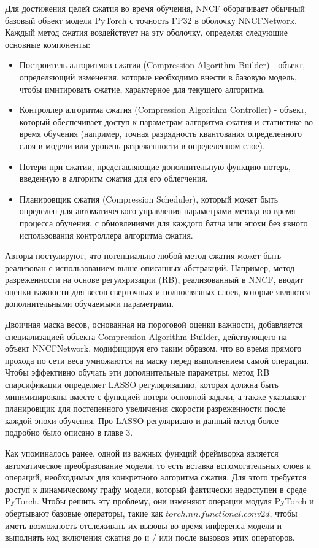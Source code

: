 \documentclass[oneside,final,12pt]{extreport}
\begin{document}
Для достижения целей сжатия во время обучения, NNCF оборачивает обычный базовый объект модели PyTorch с точность FP32 в оболочку NNCFNetwork. Каждый метод сжатия воздействует на эту оболочку, определяя следующие основные компоненты:
\begin{itemize}
    \item Построитель алгоритмов сжатия (Compression Algorithm Builder) - объект, определяющий изменения, которые необходимо внести в базовую модель, чтобы имитировать сжатие, характерное для текущего алгоритма.
    \item Контроллер алгоритма сжатия (Compression Algorithm Controller) - объект, который обеспечивает доступ к параметрам алгоритма сжатия и статистике во время обучения (например, точная разрядность квантования определенного слоя в модели или уровень разреженности в определенном слое).
    \item Потери при сжатии, представляющие дополнительную функцию потерь, введенную в алгоритм сжатия для его облегчения.
    \item Планировщик сжатия (Compression Scheduler), который может быть определен для автоматического управления параметрами метода во время процесса обучения, с обновлениями для каждого батча или эпохи без явного использования контроллера алгоритма сжатия.
\end{itemize}

Авторы постулируют, что потенциально любой метод сжатия может быть реализован с использованием выше описанных абстракций. Например, метод разреженности на основе регуляризации (RB), реализованный в NNCF, вводит оценки важности для весов сверточных и полносвязных слоев, которые являются дополнительными обучаемыми параметрами. 

Двоичная маска весов, основанная на пороговой оценки важности, добавляется специализацией объекта Compression Algorithm Builder, действующего на объект NNCFNetwork, модифицируя его таким образом, что во время прямого прохода по сети веса умножаются на маску перед выполнением самой операции. Чтобы эффективно обучать эти дополнительные параметры, метод RB спарсификации определяет LASSO регуляризацию, которая должна быть минимизирована вместе с функцией потери основной задачи, а также указывает планировщик для постепенного увеличения скорости разреженности после каждой эпохи обучения. Про LASSO регуляризаю и данный метод более подробно было описано в главе 3.

Как упоминалось ранее, одной из важных функций фреймворка является автоматическое преобразование модели, то есть вставка вспомогательных слоев и операций, необходимых для конкретного алгоритма сжатия. Для этого требуется доступ к динамическому графу модели, который фактически недоступен в среде PyTorch. Чтобы решить эту проблему, они изменяют операции модуля PyTorch и обертывают базовые операторы, такие как $torch.nn.functional.conv2d$, чтобы иметь возможность отслеживать их вызовы во время инференса модели и выполнять код включения сжатия до и / или после вызовов этих операторов.
\end{document}
